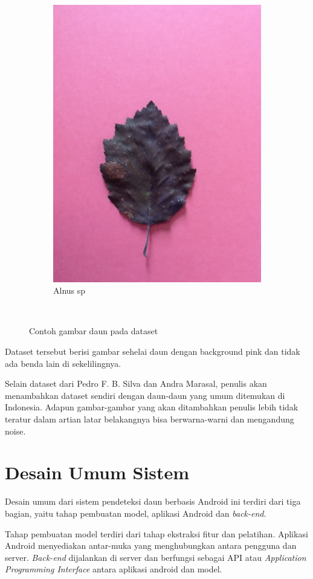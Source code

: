 \begin{figure}[ht]
\begin{subfigure}{0.5\textwidth}
		\centering\includegraphics[width=\linewidth]{bab3/figures/alnus_sp.JPG}
		\caption{Alnus sp}
		\label{fig:alnus_sp}
	\end{subfigure}
	~
	\caption{Contoh gambar daun pada dataset}
\end{figure}

\par Dataset tersebut berisi gambar sehelai daun dengan background pink dan tidak ada benda lain di sekelilingnya. 

\par Selain dataset dari Pedro F. B. Silva dan Andra Marasal, penulis akan menambahkan dataset sendiri dengan daun-daun yang umum ditemukan di Indonesia. Adapun gambar-gambar yang akan ditambahkan penulis lebih tidak teratur dalam artian latar belakangnya bisa berwarna-warni dan mengandung noise.

\section{Desain Umum Sistem}
\par Desain umum dari sistem pendeteksi daun berbasis Android ini terdiri dari tiga bagian, yaitu tahap pembuatan model, aplikasi Android dan \textit{back-end}. 
\par Tahap pembuatan model terdiri dari tahap ekstraksi fitur dan pelatihan. Aplikasi Android menyediakan antar-muka yang menghubungkan antara pengguna dan server. \textit{Back-end} dijalankan di server dan berfungsi sebagai API atau \textit{Application Programming Interface} antara aplikasi android dan model.
